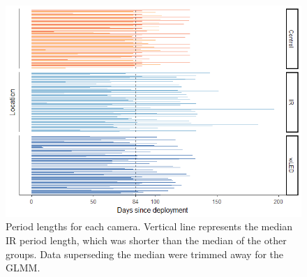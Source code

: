 \begin{figure}[b]
	\centering
	\includegraphics[width=.8\textwidth]{../R/glmm_sp_files/figure-html/period-length-wControl-1.png}
	\caption[Period lengths]
	{\small Period lengths for each camera.
		Vertical line represents the median IR period length, which was shorter than the median of the other groups. Data superseding the median were trimmed away for the GLMM.} 
	\label{fig:median_period}
\end{figure}








